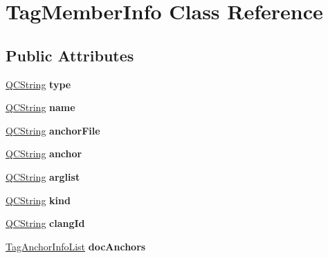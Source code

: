\hypertarget{class_tag_member_info}{}\section{Tag\+Member\+Info Class Reference}
\label{class_tag_member_info}
\subsection*{Public Attributes}
\begin{DoxyCompactItemize}
\item 
\mbox{\label{class_tag_member_info_ae90e145bfaf517d0b47b342d2297c484}} 
\mbox{\hyperlink{class_q_c_string}{Q\+C\+String}} {\bfseries type}
\item 
\mbox{\label{class_tag_member_info_ad81f703d9cbc2be2b1adc482c56cd2bd}} 
\mbox{\hyperlink{class_q_c_string}{Q\+C\+String}} {\bfseries name}
\item 
\mbox{\label{class_tag_member_info_aebc60ece7592e0fbd7d2033610587aa9}} 
\mbox{\hyperlink{class_q_c_string}{Q\+C\+String}} {\bfseries anchor\+File}
\item 
\mbox{\label{class_tag_member_info_ab20ff98f375cd8134a738bc9ca78d69d}} 
\mbox{\hyperlink{class_q_c_string}{Q\+C\+String}} {\bfseries anchor}
\item 
\mbox{\label{class_tag_member_info_a46577a5da57e5dd5d98f85fb38765656}} 
\mbox{\hyperlink{class_q_c_string}{Q\+C\+String}} {\bfseries arglist}
\item 
\mbox{\label{class_tag_member_info_aa4c0dd35f21b4e6a8a2fdbb21ae188a2}} 
\mbox{\hyperlink{class_q_c_string}{Q\+C\+String}} {\bfseries kind}
\item 
\mbox{\label{class_tag_member_info_a1f0b01f7cf9f3880c54453d3b6e21260}} 
\mbox{\hyperlink{class_q_c_string}{Q\+C\+String}} {\bfseries clang\+Id}
\item 
\mbox{\label{class_tag_member_info_a067f88b36230ce24655b30bfab86a39e}} 
\mbox{\hyperlink{class_tag_anchor_info_list}{Tag\+Anchor\+Info\+List}} {\bfseries doc\+Anchors}

\end{DoxyCompactItemize}
